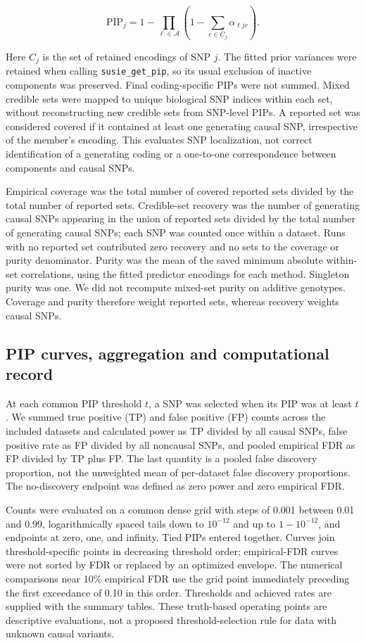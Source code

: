 \documentclass[12pt]{article}
\begin{document}
\begin{equation}
\mathrm{PIP}_j=1-\prod_{\ell\in\mathcal{A}}
 \left(1-\sum_{c\in C_j}\alpha_{\ell jc}\right).
\end{equation}

Here $C_j$ is the set of retained encodings of SNP $j$. The fitted
prior variances were retained when calling \texttt{susie\_get\_pip},
so its usual exclusion of inactive components was preserved. Final
coding-specific PIPs were not summed. Mixed credible sets were mapped
to unique biological SNP indices within each set, without reconstructing
new credible sets from SNP-level PIPs. A reported set was considered
covered if it contained at least one generating causal SNP, irrespective
of the member's encoding. This evaluates SNP localization, not correct
identification of a generating coding or a one-to-one correspondence
between components and causal SNPs.

Empirical coverage was the total number of covered reported sets divided
by the total number of reported sets. Credible-set recovery was the
number of generating causal SNPs appearing in the union of reported
sets divided by the total number of generating causal SNPs; each SNP
was counted once within a dataset. Runs with no reported set contributed
zero recovery and no sets to the coverage or purity denominator. Purity
was the mean of the saved minimum absolute within-set correlations,
using the fitted predictor encodings for each method. Singleton purity
was one. We did not recompute mixed-set purity on additive genotypes.
Coverage and purity therefore weight reported sets, whereas recovery
weights causal SNPs.

\subsection{PIP curves, aggregation and computational record}

At each common PIP threshold $t$, a SNP was selected when its PIP was
at least $t$. We summed true positive (TP) and false positive (FP)
counts across the included datasets and calculated power as TP divided
by all causal SNPs, false positive rate as FP divided by all noncausal
SNPs, and pooled empirical FDR as FP divided by TP plus FP. The last
quantity is a pooled false discovery proportion, not the unweighted
mean of per-dataset false discovery proportions. The no-discovery
endpoint was defined as zero power and zero empirical FDR.

Counts were evaluated on a common dense grid with steps of 0.001
between 0.01 and 0.99, logarithmically spaced tails down to $10^{-12}$
and up to $1-10^{-12}$, and endpoints at zero, one, and infinity.
Tied PIPs entered together. Curves join threshold-specific points in
decreasing threshold order; empirical-FDR curves were not sorted by
FDR or replaced by an optimized envelope. The numerical comparisons
near 10\% empirical FDR use the grid point immediately preceding the
first exceedance of 0.10 in this order. Thresholds and achieved rates
are supplied with the summary tables. These truth-based operating
points are descriptive evaluations, not a proposed threshold-selection
rule for data with unknown causal variants.
\end{document}
